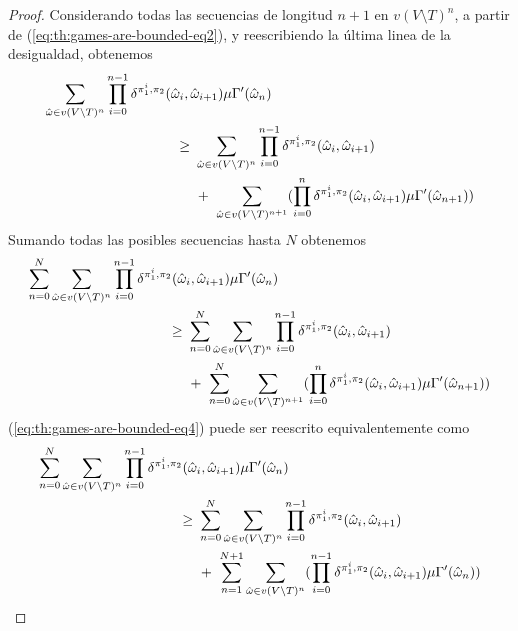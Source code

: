 \begin{proof}
  Considerando todas las secuencias de longitud $n+1$ en $v(V \setminus T)^n$,
  a partir de (\ref{eq:th:games-are-bounded-eq2}), y reescribiendo la última linea de la desigualdad, obtenemos
  \begin{align}
    \sum_{\hat{\omega} \in v(V \setminus T)^n}\prod^{n-1}_{i=0} \delta^{\strat{1}^i, \strat{2}}(\hat{\omega}_i, \hat{\omega}_{i+1}) \mu \Gamma'(\hat{\omega}_n)  \hspace{-5.5em}& \notag\\
    \geq \ & \sum_{\hat{\omega} \in v(V \setminus T)^n}\prod^{n-1}_{i=0} \delta^{\strat{1}^i, \strat{2}}(\hat{\omega}_i, \hat{\omega}_{i+1}) \label{eq:th:games-are-bounded-eq3}\\
    & + \ \sum_{\hat{\omega} \in v(V \setminus T)^{n+1}}(\prod^{n}_{i=0} \delta^{\strat{1}^i, \strat{2}}(\hat{\omega}_i, \hat{\omega}_{i+1}) \mu \Gamma'(\hat{\omega}_{n+1})) \notag
  \end{align}
  Sumando todas las posibles secuencias hasta $N$ obtenemos
  \begin{align}
    \sum^{N}_{n=0}\sum_{\hat{\omega} \in v(V \setminus T)^n}\prod^{n-1}_{i=0} \delta^{\strat{1}^i, \strat{2}}(\hat{\omega}_i, \hat{\omega}_{i+1}) \mu \Gamma'(\hat{\omega}_n)   \hspace{-6.5em}& \notag\\
    \geq \ & \sum^{N}_{n=0} \sum_{\hat{\omega} \in v(V \setminus T)^n}\prod^{n-1}_{i=0} \delta^{\strat{1}^i, \strat{2}}(\hat{\omega}_i, \hat{\omega}_{i+1}) \label{eq:th:games-are-bounded-eq4} \\
    & + \ \sum^{N}_{n=0} \sum_{\hat{\omega} \in v(V \setminus T)^{n+1}}(\prod^{n}_{i=0} \delta^{\strat{1}^i, \strat{2}}(\hat{\omega}_i, \hat{\omega}_{i+1}) \mu \Gamma'(\hat{\omega}_{n+1})) \notag
  \end{align}
  (\ref{eq:th:games-are-bounded-eq4}) puede ser reescrito equivalentemente como
  \begin{align}
    \sum^{N}_{n=0}\sum_{\hat{\omega} \in v(V \setminus T)^n}\prod^{n-1}_{i=0} \delta^{\strat{1}^i, \strat{2}}(\hat{\omega}_i, \hat{\omega}_{i+1}) \mu \Gamma'(\hat{\omega}_n)  \hspace{-6.5em}& \notag\\
    \geq \ & \sum^{N}_{n=0} \sum_{\hat{\omega} \in v(V \setminus T)^n}\prod^{n-1}_{i=0} \delta^{\strat{1}^i, \strat{2}}(\hat{\omega}_i, \hat{\omega}_{i+1}) \label{eq:th:games-are-bounded-eq5}\\
    & + \ \sum^{N+1}_{n=1} \sum_{\hat{\omega} \in v(V \setminus T)^{n}}(\prod^{n-1}_{i=0} \delta^{\strat{1}^i, \strat{2}}(\hat{\omega}_i, \hat{\omega}_{i+1}) \mu \Gamma'(\hat{\omega}_{n})) \notag

\end{align}
\end{proof}
